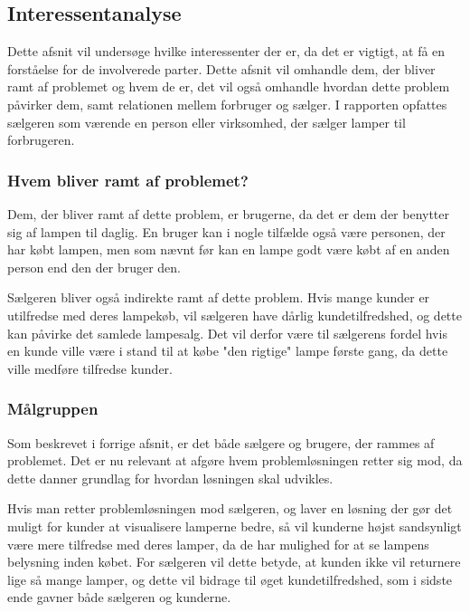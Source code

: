 \subsection{Interessentanalyse}
Dette afsnit vil undersøge hvilke interessenter der er, da det er vigtigt, at få en forståelse for de involverede parter. Dette afsnit vil omhandle dem, der bliver ramt af problemet og hvem de er, det vil også omhandle hvordan dette problem påvirker dem, samt relationen mellem forbruger og sælger. I rapporten opfattes sælgeren som værende en person eller virksomhed, der sælger lamper til forbrugeren. 

\subsubsection{Hvem bliver ramt af problemet?}
Dem, der bliver ramt af dette problem, er brugerne, da det er dem der benytter sig af lampen til daglig. En bruger kan i nogle tilfælde også være personen, der har købt lampen, men som nævnt før kan en lampe godt være købt af en anden person end den der bruger den.

Sælgeren bliver også indirekte ramt af dette problem. Hvis mange kunder er utilfredse med deres lampekøb, vil sælgeren have dårlig kundetilfredshed, og dette kan påvirke det samlede lampesalg. Det vil derfor være til sælgerens fordel hvis en kunde ville være i stand til at købe "den rigtige" lampe første gang, da dette ville medføre tilfredse kunder.

 
\subsubsection{Målgruppen}
Som beskrevet i forrige afsnit, er det både sælgere og brugere, der rammes af problemet. Det er nu relevant at afgøre hvem problemløsningen retter sig mod, da dette danner grundlag for hvordan løsningen skal udvikles. 

Hvis man retter problemløsningen mod sælgeren, og laver en løsning der gør det muligt for kunder at visualisere lamperne bedre, så vil kunderne højst sandsynligt være mere tilfredse med deres lamper, da de har mulighed for at se lampens belysning inden købet. For sælgeren vil dette betyde, at kunden ikke vil returnere lige så mange lamper, og dette vil bidrage til øget kundetilfredshed, som i sidste ende gavner både sælgeren og kunderne.

